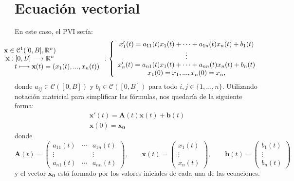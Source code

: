 \section{Ecuación vectorial}
En este caso, el PVI sería:
\begin{equation}\label{eq:vect}
 \hspace*{-3cm} 	\begin{array}{c} \textbf{x} \in \mathcal{C}^1([0,B],\R^n) \\ \textbf{x}:[0,B] \longrightarrow \R^n \\ \qquad \qquad \qquad \qquad t \longmapsto \textbf{x}(t) = (x_1(t),...,x_n(t)) \end{array}:\left\lbrace\begin{array}{c} x_1'(t) = a_{11}(t)x_1(t)+\cdots+a_{1n}(t)x_n(t)+b_1(t) \\ \vdots \\ x_n'(t) = a_{n1}(t)x_1(t)+\cdots+a_{nn}(t)x_n(t)+b_n(t) \\ x_1(0) = x_1,...,x_n(0) =x_n, \end{array}\right.
\end{equation}
donde $a_{ij} \in \mathcal{C}([0,B])$ y $b_i \in \mathcal{C}([0,B])$ para todo $i,j \in \{1,...,n\}$. Utilizando notación matricial para simplificar las fórmulas, nos quedaría de la siguiente forma:
\begin{equation}
	\begin{array}{c}
		\textbf{x}'(t) = \textbf{A}(t)\textbf{x}(t)+\textbf{b}(t) \\ \textbf{x}(0) = \textbf{x}_\textbf{0}
	\end{array}
\end{equation}
donde
\begin{equation}
	\textbf{A}(t) = \begin{pmatrix}
		a_{11}(t) & \cdots & a_{1n}(t)\\ 
		\vdots & & \vdots \\
		a_{n1}(t) & \cdots & a_{nn}(t)
	\end{pmatrix}, \qquad \textbf{x}(t) = \begin{pmatrix}
	x_1(t) \\ \vdots \\ x_n(t)
	\end{pmatrix}, \qquad \textbf{b}(t) = \begin{pmatrix}
	b_1(t) \\ \vdots \\ b_n(t)
	\end{pmatrix}
\end{equation}
y el vector $\textbf{x}_\textbf{0}$ está formado por los valores iniciales de cada una de las ecuaciones.

